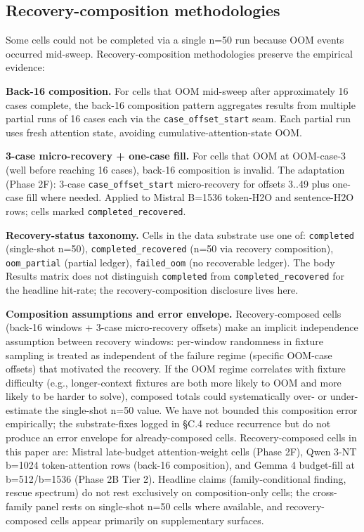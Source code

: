 \documentclass[10pt]{article}
\begin{document}
\subsection{Recovery-composition methodologies}\label{c-3-recovery-composition-methodologies}

Some cells could not be completed via a single n=50 run because OOM
events occurred mid-sweep. Recovery-composition methodologies preserve
the empirical evidence:

\textbf{Back-16 composition.} For cells that OOM mid-sweep after
approximately 16 cases complete, the back-16 composition pattern
aggregates results from multiple partial runs of 16 cases each via the
\texttt{case\_offset\_start} seam. Each partial run uses fresh attention
state, avoiding cumulative-attention-state OOM.

\textbf{3-case micro-recovery + one-case fill.} For cells that OOM at
OOM-case-3 (well before reaching 16 cases), back-16 composition is
invalid. The adaptation (Phase 2F): 3-case
\texttt{case\_offset\_start} micro-recovery for offsets 3..49 plus
one-case fill where needed. Applied to Mistral B=1536 token-H2O and
sentence-H2O rows; cells marked \texttt{completed\_recovered}.

\textbf{Recovery-status taxonomy.} Cells in the data substrate use one
of: \texttt{completed} (single-shot n=50), \texttt{completed\_recovered}
(n=50 via recovery composition), \texttt{oom\_partial} (partial ledger),
\texttt{failed\_oom} (no recoverable ledger). The body Results matrix
does not distinguish \texttt{completed} from \texttt{completed\_recovered}
for the headline hit-rate; the recovery-composition disclosure lives
here.

\textbf{Composition assumptions and error envelope.} Recovery-composed
cells (back-16 windows + 3-case micro-recovery offsets) make an implicit
independence assumption between recovery windows: per-window randomness
in fixture sampling is treated as independent of the failure regime
(specific OOM-case offsets) that motivated the recovery. If the OOM
regime correlates with fixture difficulty (e.g., longer-context
fixtures are both more likely to OOM and more likely to be harder to
solve), composed totals could systematically over- or under-estimate
the single-shot n=50 value. We have not bounded this composition error
empirically; the substrate-fixes logged in \S{}C.4 reduce recurrence but do
not produce an error envelope for already-composed cells.
Recovery-composed cells in this paper are: Mistral late-budget
attention-weight cells (Phase 2F), Qwen 3-NT b=1024 token-attention rows
(back-16 composition), and Gemma 4 budget-fill at b=512/b=1536 (Phase
2B Tier 2). Headline claims (family-conditional finding, rescue
spectrum) do not rest exclusively on composition-only cells; the
cross-family panel rests on single-shot n=50 cells where available, and
recovery-composed cells appear primarily on supplementary surfaces.
\end{document}

